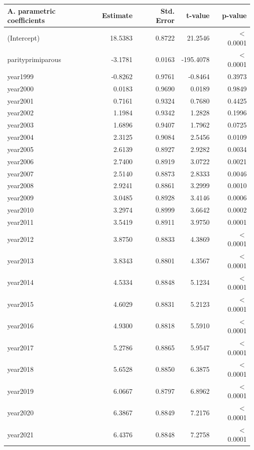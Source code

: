     \begin{table}[H]
    \centering
    \begin{tabular}{lrrrr}
    \textbf{A. parametric coefficients} & Estimate & Std. Error & t-value & p-value \\ 
       \hline
       \hline
  (Intercept) & 18.5383 & 0.8722 & 21.2546 & $<$ 0.0001 \\ 
  parityprimiparous & -3.1781 & 0.0163 & -195.4078 & $<$ 0.0001 \\ 
  year1999 & -0.8262 & 0.9761 & -0.8464 & 0.3973 \\ 
  year2000 & 0.0183 & 0.9690 & 0.0189 & 0.9849 \\ 
  year2001 & 0.7161 & 0.9324 & 0.7680 & 0.4425 \\ 
  year2002 & 1.1984 & 0.9342 & 1.2828 & 0.1996 \\ 
  year2003 & 1.6896 & 0.9407 & 1.7962 & 0.0725 \\ 
  year2004 & 2.3125 & 0.9084 & 2.5456 & 0.0109 \\ 
  year2005 & 2.6139 & 0.8927 & 2.9282 & 0.0034 \\ 
  year2006 & 2.7400 & 0.8919 & 3.0722 & 0.0021 \\ 
  year2007 & 2.5140 & 0.8873 & 2.8333 & 0.0046 \\ 
  year2008 & 2.9241 & 0.8861 & 3.2999 & 0.0010 \\ 
  year2009 & 3.0485 & 0.8928 & 3.4146 & 0.0006 \\ 
  year2010 & 3.2974 & 0.8999 & 3.6642 & 0.0002 \\ 
  year2011 & 3.5419 & 0.8911 & 3.9750 & 0.0001 \\ 
  year2012 & 3.8750 & 0.8833 & 4.3869 & $<$ 0.0001 \\ 
  year2013 & 3.8343 & 0.8801 & 4.3567 & $<$ 0.0001 \\ 
  year2014 & 4.5334 & 0.8848 & 5.1234 & $<$ 0.0001 \\ 
  year2015 & 4.6029 & 0.8831 & 5.2123 & $<$ 0.0001 \\ 
  year2016 & 4.9300 & 0.8818 & 5.5910 & $<$ 0.0001 \\ 
  year2017 & 5.2786 & 0.8865 & 5.9547 & $<$ 0.0001 \\ 
  year2018 & 5.6528 & 0.8850 & 6.3875 & $<$ 0.0001 \\ 
  year2019 & 6.0667 & 0.8797 & 6.8962 & $<$ 0.0001 \\ 
  year2020 & 6.3867 & 0.8849 & 7.2176 & $<$ 0.0001 \\ 
  year2021 & 6.4376 & 0.8848 & 7.2758 & $<$ 0.0001 \\ 

\end{tabular}
\end{table}
